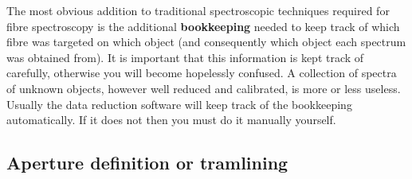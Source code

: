 \documentclass[twoside,11pt]{starlink}
\begin{document}
The most obvious addition to traditional spectroscopic techniques
required for fibre spectroscopy is the additional \textbf{bookkeeping}
needed to keep track of which fibre was targeted on which object (and
consequently which object each spectrum was obtained from).  It is
important that this information is kept track of carefully, otherwise
you will become hopelessly confused.  A collection of spectra of
unknown objects, however well reduced and calibrated, is more or less
useless.  Usually the data reduction software will keep track of the
bookkeeping automatically.  If it does not then you must do it manually
yourself.

\subsection{Aperture definition or tramlining}
\end{document}
